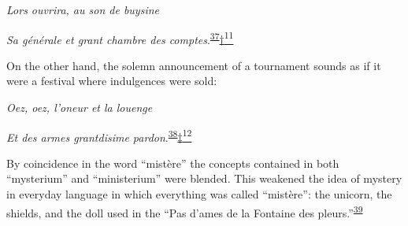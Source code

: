 \emph{Lors ouvrira, au son de buysine}

\emph{Sa générale et grant chambre des
comptes}.\textsuperscript{\protect\hypertarget{13_Chapter_Six__THE_DEPICTION_OF_TH.xhtmlux5cux23id_1197}{\protect\hyperlink{23_NOTES.xhtmlux5cux23id_1198}{37}}}\protect\hypertarget{13_Chapter_Six__THE_DEPICTION_OF_TH.xhtmlux5cux23id_3009}{\protect\hyperlink{23_NOTES.xhtmlux5cux23id_3010}{†\textsuperscript{11}}}

On the other hand, the solemn announcement of a tournament sounds as if
it were a festival where indulgences were sold:

\emph{Oez, oez, l'oneur et la louenge}

\emph{Et des armes grantdisime
pardon}.\textsuperscript{\protect\hypertarget{13_Chapter_Six__THE_DEPICTION_OF_TH.xhtmlux5cux23id_1195}{\protect\hyperlink{23_NOTES.xhtmlux5cux23id_1196}{38}}}\protect\hypertarget{13_Chapter_Six__THE_DEPICTION_OF_TH.xhtmlux5cux23id_3011}{\protect\hyperlink{23_NOTES.xhtmlux5cux23id_3012}{‡\textsuperscript{12}}}

By coincidence in the word ``mistère'' the concepts contained in both
``mysterium'' and ``ministerium'' were blended. This weakened the idea
of mystery in everyday language in which everything
\protect\hypertarget{13_Chapter_Six__THE_DEPICTION_OF_TH.xhtmlux5cux23page_181}{}{}was
called ``mistère'': the unicorn, the shields, and the doll used in the
``Pas d'ames de la Fontaine des
pleurs.''\textsuperscript{\protect\hypertarget{13_Chapter_Six__THE_DEPICTION_OF_TH.xhtmlux5cux23id_1193}{\protect\hyperlink{23_NOTES.xhtmlux5cux23id_1194}{39}}}


